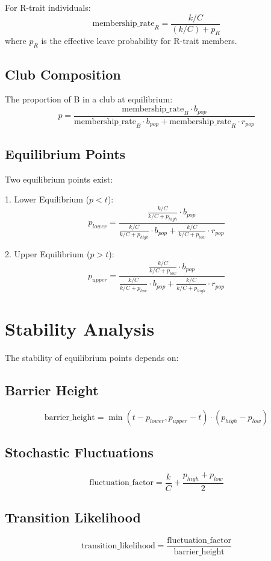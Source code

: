 \documentclass{article}
\begin{document}
For R-trait individuals:
\[ \text{membership\_rate}_R = \frac{k/C}{(k/C) + p_R} \]
where $p_R$ is the effective leave probability for R-trait members.

\subsection{Club Composition}
The proportion of B in a club at equilibrium:
\[ p = \frac{\text{membership\_rate}_B \cdot b_{pop}}{\text{membership\_rate}_B \cdot b_{pop} + \text{membership\_rate}_R \cdot r_{pop}} \]

\subsection{Equilibrium Points}
Two equilibrium points exist:

1. Lower Equilibrium ($p < t$):
\[ p_{lower} = \frac{\frac{k/C}{k/C + p_{high}} \cdot b_{pop}}{\frac{k/C}{k/C + p_{high}} \cdot b_{pop} + \frac{k/C}{k/C + p_{low}} \cdot r_{pop}} \]

2. Upper Equilibrium ($p > t$):
\[ p_{upper} = \frac{\frac{k/C}{k/C + p_{low}} \cdot b_{pop}}{\frac{k/C}{k/C + p_{low}} \cdot b_{pop} + \frac{k/C}{k/C + p_{high}} \cdot r_{pop}} \]

\section{Stability Analysis}
The stability of equilibrium points depends on:

\subsection{Barrier Height}
\[ \text{barrier\_height} = \min(t - p_{lower}, p_{upper} - t) \cdot (p_{high} - p_{low}) \]

\subsection{Stochastic Fluctuations}
\[ \text{fluctuation\_factor} = \frac{k}{C} + \frac{p_{high} + p_{low}}{2} \]

\subsection{Transition Likelihood}
\[ \text{transition\_likelihood} = \frac{\text{fluctuation\_factor}}{\text{barrier\_height}} \]
\end{document}
